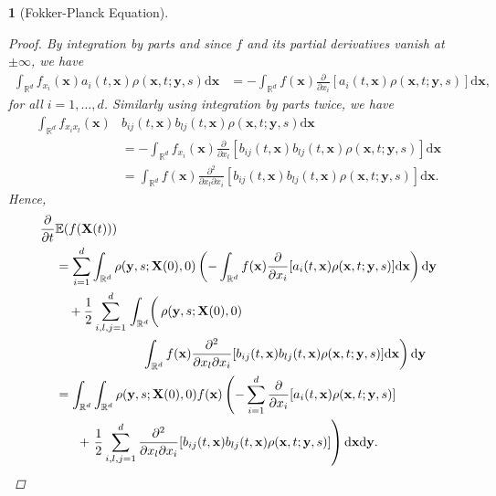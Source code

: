 \documentclass[english]{article}
\numberwithin{equation}{section}
\numberwithin{figure}{section}
\theoremstyle{bolddescit}
\newtheorem{theorem}{\protect\theoremname}[section]
\theoremstyle{definition}
\theoremstyle{definition}
\theoremstyle{plain}
\theoremstyle{plain}
\theoremstyle{bolddesc}
\theoremstyle{plain}
\theoremstyle{remark}
\providecommand{\theoremname}{Theorem}
\begin{document}
\begin{theorem}[Fokker-Planck Equation]
\begin{proof}
    By integration by parts and since $f$ and its partial derivatives vanish at $\pm \infty$, we have
    \begin{align*}
      \int_{\mathbb{R}^d} f_{x_i}(\mathbf{x}) a_i(t,\mathbf{x}) \rho(\mathbf{x},t;\mathbf{y},s) \mathrm{d}\mathbf{x}
      &= - \int_{\mathbb{R}^d} f(\mathbf{x}) \frac{\partial}{\partial x_i}[a_i(t,\mathbf{x}) \rho(\mathbf{x},t;\mathbf{y},s)] \mathrm{d}\mathbf{x},
    \end{align*}
    for all $i=1,\ldots,d$. Similarly using integration by parts twice, we have
    \begin{align*}
      \int_{\mathbb{R}^d} f_{x_i x_l}(\mathbf{x}) &b_{ij}(t,\mathbf{x}) b_{lj}(t,\mathbf{x}) \rho(\mathbf{x},t;\mathbf{y},s) \mathrm{d}\mathbf{x}\\
      &= - \int_{\mathbb{R}^d} f_{x_i}(\mathbf{x}) \frac{\partial}{\partial x_l}[b_{ij}(t,\mathbf{x}) b_{lj}(t,\mathbf{x}) \rho(\mathbf{x},t;\mathbf{y},s)] \mathrm{d}\mathbf{x}\\
      &= \int_{\mathbb{R}^d} f(\mathbf{x}) \frac{\partial^2}{\partial x_l \partial x_i}[b_{ij}(t,\mathbf{x}) b_{lj}(t,\mathbf{x}) \rho(\mathbf{x},t;\mathbf{y},s)] \mathrm{d}\mathbf{x}.
    \end{align*}
    Hence,
    \begin{align}
      \frac{\partial}{\partial t}&\mathbb{E}(f(\mathbf{X}(t)))\notag\\
      &= \sum_{i=1}^{d} \int_{\mathbb{R}^d} \rho(\mathbf{y},s;\mathbf{X}(0),0) \left( - \int_{\mathbb{R}^d} f(\mathbf{x}) \frac{\partial}{\partial x_i}[a_i(t,\mathbf{x}) \rho(\mathbf{x},t;\mathbf{y},s)] \mathrm{d}\mathbf{x} \right) \mathrm{d}\mathbf{y}\notag\\
        &\ \ \ + \frac{1}{2} \sum_{i,l,j=1}^{d} \left.\int_{\mathbb{R}^d} \right(\rho(\mathbf{y},s;\mathbf{X}(0),0) \notag\\
        &\ \ \ \ \ \ \ \ \ \ \ \ \ \ \ \ \ \ \ \ \left.\int_{\mathbb{R}^d} f(\mathbf{x}) \frac{\partial^2}{\partial x_l \partial x_i}[b_{ij}(t,\mathbf{x}) b_{lj}(t,\mathbf{x}) \rho(\mathbf{x},t;\mathbf{y},s)] \mathrm{d}\mathbf{x} \right)\mathrm{d}\mathbf{y}\notag\\
      &= \int_{\mathbb{R}^d} \int_{\mathbb{R}^d} \rho(\mathbf{y},s;\mathbf{X}(0),0) f(\mathbf{x}) \left(- \sum_{i=1}^d \frac{\partial}{\partial x_i}[a_i(t,\mathbf{x}) \rho(\mathbf{x},t;\mathbf{y},s)] \right.\notag\\
        &\ \ \ \ \ + \left.\frac{1}{2} \sum_{i,l,j=1}^{d} \frac{\partial^2}{\partial x_l \partial x_i}[b_{ij}(t,\mathbf{x}) b_{lj}(t,\mathbf{x}) \rho(\mathbf{x},t;\mathbf{y},s)] \right) \mathrm{d}\mathbf{x} \mathrm{d}\mathbf{y}.\label{eq:fp-proof-1}
    \end{align}


\end{proof}
\end{theorem}
\end{document}
